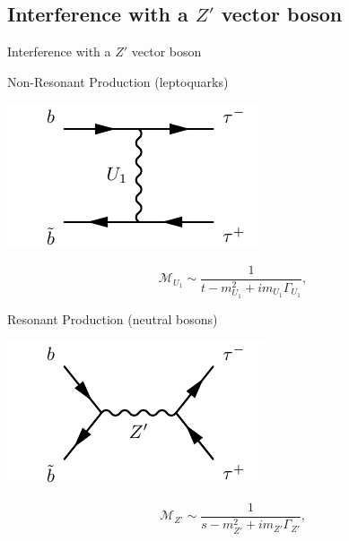 \documentclass{../bredelebeamer}
\begin{document}
\subsection{Interference with a $Z'$ vector boson}
\begin{frame}{Interference with a $Z'$ vector boson}
\begin{minipage}{.48\linewidth}
	Non-Resonant Production (leptoquarks)
	\begin{center}
		\includegraphics[width=.9\linewidth,height=.5\linewidth]{non-res_vector.pdf}
	\end{center}
	\begin{equation}
		\mathcal{M}_{U_1} \sim \frac{1}{t-m_{U_1}^2 + i m_{U_1} \Gamma_{U_1}},
	\end{equation}
\end{minipage}
\hfill
\begin{minipage}{.48\linewidth}
	Resonant Production (neutral bosons)
	\begin{center}
		\includegraphics[width=.9\linewidth,height=.5\linewidth]{DY.pdf}
	\end{center}
	\begin{equation}
		\mathcal{M}_{Z'} \sim \frac{1}{s-m_{Z'}^2 + i m_{Z'} \Gamma_{Z'}},
	\end{equation}
\end{minipage}

\end{frame}
\end{document}
